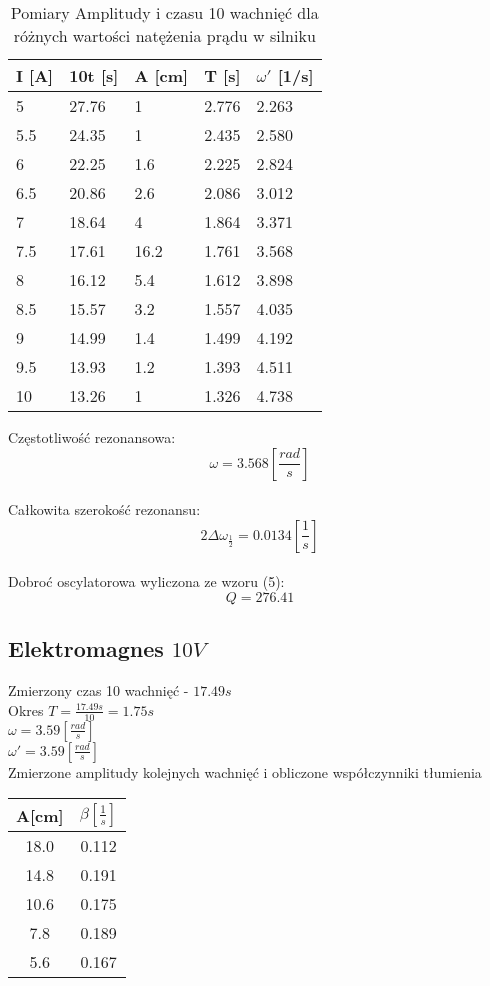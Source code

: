 \documentclass[]{article}
\begin{document}
	\begin{table}[h]
		\centering
		\caption{Pomiary Amplitudy i czasu 10 wachnięć dla różnych wartości natężenia prądu w silniku}
		\begin{tabular}{|l|l|l|l|l|}
			\hline
			
			I [A] & 10t [s] & A [cm] & T [s] & $\omega'$ [1/s] \\ \hline
			5 & 27.76 & 1 & 2.776 & 2.263 \\ \hline
			5.5 & 24.35 & 1 & 2.435 & 2.580 \\ \hline
			6 & 22.25 & 1.6 & 2.225 & 2.824 \\ \hline
			6.5 & 20.86 & 2.6 & 2.086 & 3.012 \\ \hline
			7 & 18.64 & 4 & 1.864 & 3.371 \\ \hline
			7.5 & 17.61 & 16.2 & 1.761 & 3.568 \\ \hline
			8 & 16.12 & 5.4 & 1.612 & 3.898 \\ \hline
			8.5 & 15.57 & 3.2 & 1.557 & 4.035 \\ \hline
			9 & 14.99 & 1.4 & 1.499 & 4.192 \\ \hline
			9.5 & 13.93 & 1.2 & 1.393 & 4.511 \\ \hline
			10 & 13.26 & 1 & 1.326 & 4.738 \\ \hline
			
		\end{tabular}
	\end{table}
	
	Częstotliwość rezonansowa:
	$$\omega = 3.568 \left[ \frac{rad}{s}\right]$$\\
	Całkowita szerokość rezonansu:
	$$2\Delta\omega_{\frac{1}{2}} = 0.0134 \left[ \frac{1}{s}\right] $$\\	
	Dobroć oscylatorowa wyliczona ze wzoru (5):
	$$Q = 276.41$$
	
	
	\subsection{Elektromagnes $10V$}
	Zmierzony czas 10 wachnięć - $17.49s$\\
	Okres $T=\frac{17.49s}{10} = 1.75s$\\
	$\omega = 3.59 \left[ \frac{rad}{s}\right]$\\
	$\omega' = 3.59 \left[ \frac{rad}{s}\right]$\\
	Zmierzone amplitudy kolejnych wachnięć i obliczone współczynniki tłumienia
	\begin{table}[h]
		\begin{tabular}{|c|c|}
			\hline 
			A[cm] & $\beta\left[ \frac{1}{s}\right] $ \\ 
			\hline 
			18.0 & 0.112 \\ 
			\hline 
			14.8 & 0.191 \\ 
			\hline 
			10.6 & 0.175 \\ 
			\hline 
			7.8 & 0.189 \\ 
			\hline 
			5.6 & 0.167 \\ 
			\hline 
		\end{tabular} 
	\end{table}
\end{document}
